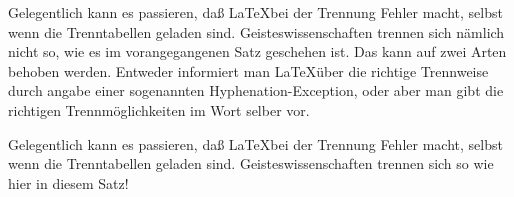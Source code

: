 \documentclass[a5paper]{article}
\begin{document}
Gelegentlich kann es passieren, daß \LaTeX bei der Trennung Fehler macht, selbst wenn die
Trenntabellen geladen sind.
Geisteswissenschaften trennen sich nämlich nicht so, wie es im vorangegangenen
Satz geschehen ist. Das kann auf zwei Arten behoben werden. Entweder informiert man \LaTeX über
die richtige Trennweise durch angabe einer sogenannten Hyphenation-Exception, oder aber
man gibt die richtigen Trennmöglichkeiten im Wort selber vor.

Gelegentlich kann es passieren, daß \LaTeX bei der Trennung Fehler macht, selbst wenn die
Trenntabellen geladen sind.
Geis\-tes\-wis\-sen\-schaf\-ten trennen sich so wie hier in diesem Satz!
\end{document}
